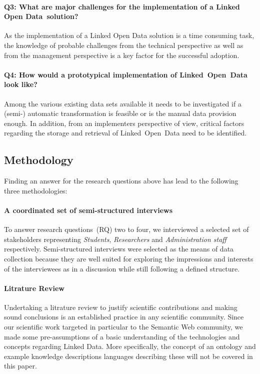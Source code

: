 \documentclass{article}
\begin{document}
\paragraph{Q3: What are major challenges for the implementation of a Linked Open Data~solution?}
As the implementation of a Linked Open Data solution is a time consuming task, the knowledge of probable challenges from the technical perspective as well as from the management perspective is a key factor for the successful adoption. 
\paragraph{Q4: How would a prototypical implementation of Linked~Open~Data look like?}
Among the various existing data sets available it needs to be investigated if a (semi-) automatic transformation is feasible or is the manual data provision enough. In addition, from an implementers perspective of view, critical factors regarding the storage and retrieval of Linked~Open~Data need to be identified. 

\subsection{Methodology}
Finding an answer for the research questions above has lead to the following three methodologies:
\paragraph{A coordinated set of semi-structured interviews}
To answer research questions~(RQ) two to four, we interviewed a selected set of stakeholders representing \textit{Students}, \textit{Researchers} and \textit{Administration staff} respectively. Semi-structured interviews were selected as the means of data collection because they are well suited for exploring the impressions and interests of the interviewees as in a discussion while still following a defined structure. 
\paragraph{Litrature Review}
Undertaking a litrature review to justify scientific contributions and making sound conclusions is an established practice in any scientific community. Since our scientific work targeted in particular to the Semantic Web community, we made some pre-assumptions of a basic understanding of the technologies and concepts regarding Linked Data. More specifically, the concept of an ontology and example knowledge descriptions languages describing these will not be covered in this paper. 
\end{document}
